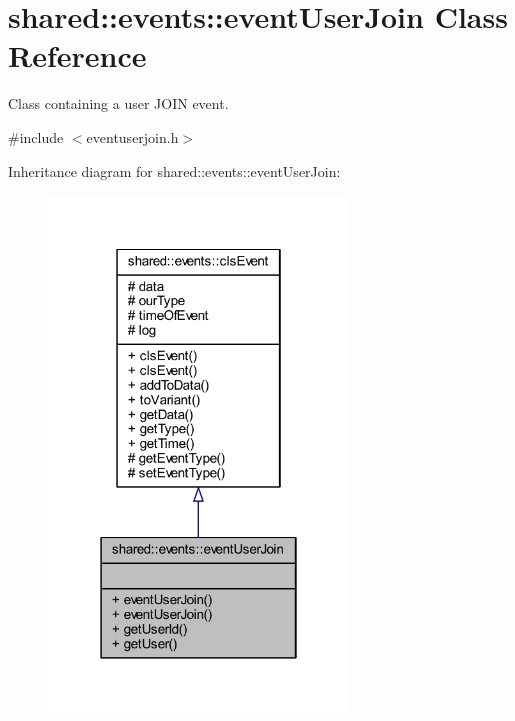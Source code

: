 \hypertarget{classshared_1_1events_1_1event_user_join}{\section{shared\-:\-:events\-:\-:event\-User\-Join Class Reference}
\label{dd/d05/classshared_1_1events_1_1event_user_join}
}


Class containing a user J\-O\-I\-N event.  




{\ttfamily \#include $<$eventuserjoin.\-h$>$}



Inheritance diagram for shared\-:\-:events\-:\-:event\-User\-Join\-:\nopagebreak
\begin{figure}[H]
\begin{center}
\leavevmode
\includegraphics[width=226pt]{da/d30/classshared_1_1events_1_1event_user_join__inherit__graph}
\end{center}
\end{figure}


